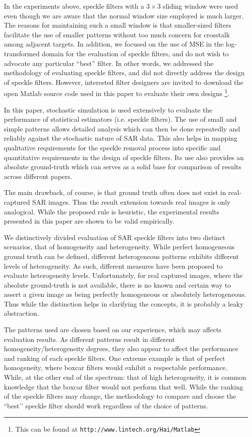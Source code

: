 In the experiments above, speckle filters with a $3 \times 3$ sliding window were used 
	even though we are aware that the normal window size employed is much larger. 
The reasons for maintaining such a small window is that 
	smaller-sized filters facilitate the use of smaller patterns without too much concern for crosstalk 
	among adjacent targets.
In addition, we focused on the use of MSE in the log-transformed domain for the evaluation of speckle filters, 
	and do not wish to advocate any particular ``best'' filter. 
In other words, we addressed the methodology of evaluating speckle filters, 
	and did not directly address the design of speckle filters.
However, interested filter designers are invited to download the open Matlab source code used in this paper 
to evaluate their own designs
  \footnote{This can be found at \texttt{http://www.lintech.org/Hai/Matlab}}.

In this paper, stochastic simulation is used extensively to evaluate the performance of statistical estimators 
(i.e. speckle filters).
The use of small and simple patterns allows detailed analysis
  which can then be done repeatedly and reliably against the 
stochastic nature of SAR data.
This also helps in mapping qualitative requirements for the speckle removal process into specific and quantitative 
requirements in the design of speckle filters.
Its use also provides an absolute ground-truth which can serves as a solid base for comparison of results across different papers.

The main drawback, of course, is that ground truth often does not exist in real-captured SAR images.
Thus the result extension towards real images is only analogical.
While the proposed rule is heuristic, 
	the experimental results presented in this paper are shown to be valid empirically.

We distinctively divided evaluation of SAR speckle filters into two distinct scenarios, that of homogeneity and heterogeneity.
While perfect homogeneous ground truth can be defined, 
	different heterogeneous patterns exhibits different levels of heterogeneity. 
As such, different measures have been proposed to evaluate heterogeneity levels.
Unfortunately, for real captured images, where the absolute ground-truth is not available, 
	there is no known and certain way to assert a given image as being perfectly homogeneous or 
	absolutely heterogeneous.
Thus while the distinction helps in clarifying the concepts, 
	it is probably a leaky abstraction.

The patterns used are chosen based on our experience, which may affects evaluation results. 
As different patterns result in different homogeneity/heterogeneity degrees, 
	they also appear to affect the performance and ranking of each speckle filters.
One extreme example is that of perfect homogeneity, where boxcar filters would exhibit a respectable performance.
While, at the other end of the spectrum: that of high heterogeneity, it is common knowledge that the boxcar filter 
	would not perform that well.
While the ranking of the speckle filters may change, the methodology to compare and choose the ``best’’ speckle filter should work regardless of the choice of patterns.

